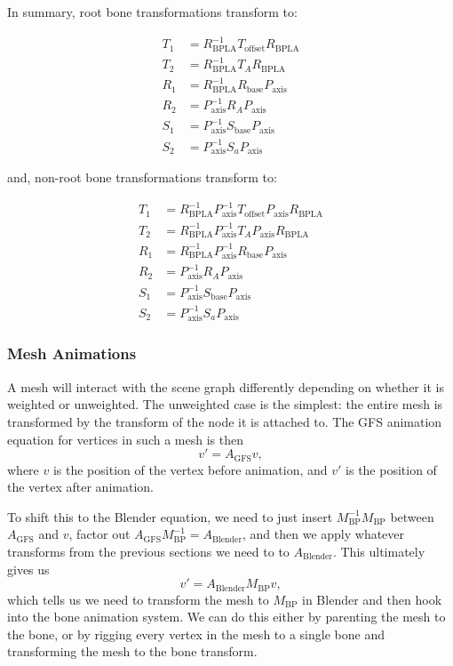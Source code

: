 \documentclass{article}
\begin{document}
In summary, root bone transformations transform to:
\begin{tcolorbox}
\begin{align}
T_1 &= R_\mathrm{BPLA}^{-1} T_\mathrm{offset} R_\mathrm{BPLA}\\
T_2 &= R_\mathrm{BPLA}^{-1} T_A R_\mathrm{BPLA}  \\
R_1 &= R_\mathrm{BPLA}^{-1} R_\mathrm{base} P_\mathrm{axis}\\
R_2 &= P_\mathrm{axis}^{-1} R_A P_\mathrm{axis}\\
S_1 &= P_\mathrm{axis}^{-1} S_\mathrm{base} P_\mathrm{axis}\\
S_2 &= P_\mathrm{axis}^{-1} S_a P_\mathrm{axis}
\end{align}
\end{tcolorbox}
and, non-root bone transformations transform to:
\begin{tcolorbox}
\begin{align}
T_1 &= R_\mathrm{BPLA}^{-1} P_\mathrm{axis}^{-1} T_\mathrm{offset} P_\mathrm{axis} R_\mathrm{BPLA}\\
T_2 &= R_\mathrm{BPLA}^{-1} P_\mathrm{axis}^{-1} T_A P_\mathrm{axis} R_\mathrm{BPLA}  \\
R_1 &= R_\mathrm{BPLA}^{-1} P_\mathrm{axis}^{-1}  R_\mathrm{base} P_\mathrm{axis}\\
R_2 &= P_\mathrm{axis}^{-1} R_A P_\mathrm{axis}\\
S_1 &= P_\mathrm{axis}^{-1} S_\mathrm{base} P_\mathrm{axis}\\
S_2 &= P_\mathrm{axis}^{-1} S_a P_\mathrm{axis}
\end{align}
\end{tcolorbox}


\subsubsection{Mesh Animations}
A mesh will interact with the scene graph differently depending on whether it is weighted or unweighted. The unweighted case is the simplest: the entire mesh is transformed by the transform of the node it is attached to. The GFS animation equation for vertices in such a mesh is then
\begin{equation}
v'  = A_\mathrm{GFS} v,
\end{equation}
where $v$ is the position of the vertex before animation, and $v'$ is the position of the vertex after animation. 

To shift this to the Blender equation, we need to just insert $M_\mathrm{BP}^{-1}M_\mathrm{BP}$ between $A_\mathrm{GFS}$ and $v$, factor out $A_\mathrm{GFS}M_\mathrm{BP}^{-1} = A_\mathrm{Blender}$, and then we apply whatever transforms from the previous sections we need to to $A_\mathrm{Blender}$. This ultimately gives us
\begin{equation}
v'  = A_\mathrm{Blender} M_\mathrm{BP} v,
\end{equation}
which tells us we need to transform the mesh to $M_\mathrm{BP}$ in Blender and then hook into the bone animation system. We can do this either by parenting the mesh to the bone, or by rigging every vertex in the mesh to a single bone and transforming the mesh to the bone transform.
\end{document}
